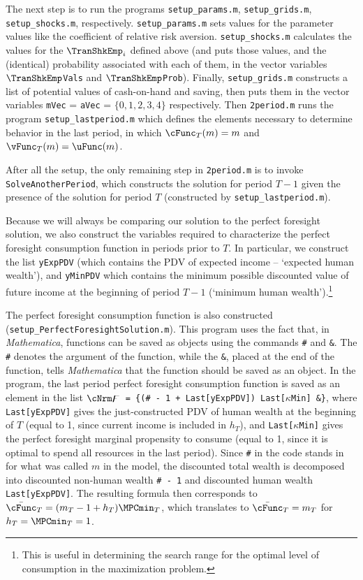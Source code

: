 \documentclass[titlepage, headings=optiontotocandhead]{\econtex}
\newcommand{\Mma}{\textit{Mathematica}}
\begin{document}
The next step is to
run the programs \texttt{setup\_params.m}, \texttt{setup\_grids.m},
\texttt{setup\_shocks.m}, respectively. \texttt{setup\_params.m} sets values for the
parameter values like the coefficient of relative risk aversion.
\texttt{setup\_shocks.m} calculates the values for the $\TranShkEmp_{i}$
defined above (and puts those values, and the (identical) probability associated
with each of them, in the vector variables \texttt{$\TranShkEmp$Vals} and
\texttt{$\TranShkEmp$Prob}).  Finally, \texttt{setup\_grids.m} constructs a
list of potential values of cash-on-hand and saving, then puts them in the vector
variables \texttt{mVec} = \texttt{aVec} = $\{0,1,2,3,4\}$ respectively.
Then \texttt{2period.m} runs the program \texttt{setup\_lastperiod.m}
which defines the elements necessary to determine behavior in the last
period, in which $\cFunc_{T}(m)=m$ and $\vFunc_{T}(m)=\uFunc(m)$.

After all the setup, the only remaining step in
\texttt{2period.m} is to invoke \texttt{SolveAnotherPeriod}, which
constructs the solution for period $T-1$ given the presence of the
solution for period $T$ (constructed by \texttt{setup\_lastperiod.m}).

Because we will always be comparing our solution to the perfect
foresight solution, we also construct the variables required to
characterize the perfect foresight consumption function in periods
prior to $T$.  In particular, we construct the list \texttt{yExpPDV}
(which contains the PDV of expected income -- `expected human
wealth'), and \texttt{yMinPDV} which contains the minimum possible
discounted value of future income at the beginning of period $T-1$
(`minimum human wealth').\footnote{This is useful in determining the
  search range for the optimal level of consumption in the
  maximization problem.}

The perfect foresight consumption function is also constructed
(\texttt{setup\_PerfectForesightSolution.m}).  This program uses the
fact that, in {\Mma}, functions can be saved as objects using the
commands \texttt{\#} and \texttt{\&}. The \texttt{\#} denotes the
argument of the function, while the \texttt{\&}, placed at the end of
the function, tells {\Mma} that the function should be saved as an
object. In the program, the last period perfect foresight consumption
function is saved as an element in the list \texttt{$\cNrm\digamma$ =
  \{(\# - 1 + Last[yExpPDV]) Last[$\kappa$Min] \&\}}, where
\texttt{Last[yExpPDV]} gives the just-constructed PDV of human wealth
at the beginning of $T$ (equal to 1, since current income is included
in $h_{T}$), and \texttt{Last[$\kappa$Min]} gives the perfect
foresight marginal propensity to consume (equal to 1, since it is
optimal to spend all resources in the last period). Since \texttt{\#}
in the code stands in for what was called $m$ in the model, the
discounted total wealth is decomposed into discounted non-human wealth
\texttt{\# - 1} and discounted human wealth
\texttt{Last[yExpPDV]}. The resulting formula then corresponds to
$\bar{\cFunc}_{T} = (m_{T}-1+{h}_{T})\MPCmin_{T}$, which translates to
$\bar{\cFunc}_{T} = m_{T}$ for ${h}_{T}=\MPCmin_{T}=1$.
\end{document}
